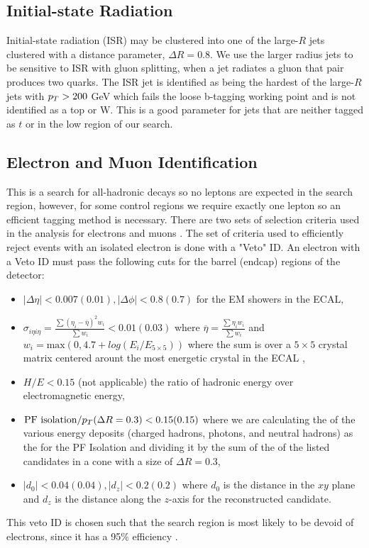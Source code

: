 \subsection{Initial-state Radiation}\label{ISRpt}

Initial-state radiation (ISR) may be clustered into one of the large-$R$ jets clustered with a distance parameter, $\Delta R=0.8$. We use the larger radius jets to be sensitive to ISR with gluon splitting, when a jet radiates a gluon that pair produces two quarks. The ISR jet is identified as being the hardest of the large-$R$ jets with $p_{T}>200$ GeV which fails the loose b-tagging working point and is not identified as a top or W. This is a good parameter for jets that are neither tagged as $t$ or \W{} in the low \dm{} region of our search.
 
\subsection{Electron and Muon Identification}\label{EleMuonID}
 This is a search for all-hadronic decays so no leptons are expected in the search region, however, for some control regions we require exactly one lepton so an efficient tagging method is necessary. There are two sets of selection criteria used in the analysis for electrons \cite{noauthor_performance_2015} and muons \cite{collaboration_performance_2013}. The set of criteria used to efficiently reject events with an isolated electron is done with a "Veto" ID. An electron with a Veto ID must pass the following cuts for the barrel (endcap) regions of the detector:
 \begin{itemize}
	 \item $|\Delta\eta|<0.007(0.01),|\Delta\phi|<0.8(0.7)$ for the EM showers in the ECAL,
	 \item $\sigma_{i\eta i\eta}=\frac{\sum(\eta_i-\overline{\eta})^2w_i}{\sum w_i}<0.01(0.03)$ where $\overline{\eta}=\frac{\sum\eta_iw_i}{\sum w_i}$ and $w_i=\text{max}(0,4.7+log(E_i/E_{5\times5}))$ where the sum is over a $5\times5$ crystal matrix centered arount the most energetic crystal in the ECAL \cite{collaboration_missing_2011},
	 \item $H/E<0.15$ (not applicable) the ratio of hadronic energy over electromagnetic energy,
	 \item $\text{PF isolation}/p_{T}(\Delta R=0.3)<0.15(0.15)$ where we are calculating the \pt{} of the various energy deposits (charged hadrons, photons, and neutral hadrons) as the \pt{} for the PF Isolation and dividing it by the sum of the \pt{} of the listed candidates in a cone with a size of $\Delta R=0.3$,
	 \item $|d_{0}|<0.04(0.04),|d_z|<0.2(0.2)$ where $d_0$ is the distance in the $xy$ plane and $d_z$ is the distance along the $z$-axis for the reconstructed candidate.
 \end{itemize}
This veto ID is chosen such that the search region is most likely to be devoid of electrons, since it has a 95\% efficiency \cite{noauthor_https://twiki.cern.ch/twiki/bin/view/cms/cutbasedelectronidentificationrun2_nodate}.
 
